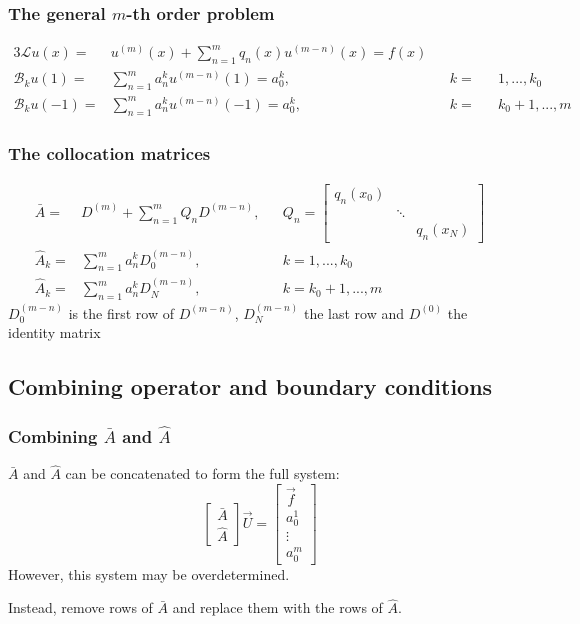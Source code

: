 \documentclass[handout]{beamer}
\begin{document}
\begin{frame}
\frametitle{The general $m$-th order problem}
\begin{alignat*}{3}
\mathcal{L} u(x) = &  u^{(m)}(x) + \sum_{n = 1}^m q_n(x) u^{(m-n)}(x) = f(x) \\
\mathcal{B}_k u(1) = & \sum_{n = 1}^m a_n^k u^{(m-n)}(1) = a_0^k, && k = && 1,...,k_0 \\
\mathcal{B}_k u(-1) = & \sum_{n = 1}^m a_n^k u^{(m-n)}(-1) = a_0^k, && k = && k_0+1,...,m 
\end{alignat*}
\end{frame}

\begin{frame}
\frametitle{The collocation matrices}
\begin{align*}
\bar{A} = & D^{(m)} + \sum_{n=1}^m Q_n D^{(m-n)}, && Q_n = \begin{bmatrix} q_n(x_0) & & \\ & \ddots & \\ & & q_n(x_N) \end{bmatrix} \\
\hat{A}_k = & \sum_{n=1}^m a_n^k D^{(m-n)}_0, && k = 1,...,k_0 \\
\hat{A}_k = & \sum_{n=1}^m a_n^k D^{(m-n)}_N, && k = k_0+1,...,m
\end{align*}
$D_0^{(m-n)}$ is the first row of $D^{(m-n)}$, $D_N^{(m-n)}$ the last row and $D^{(0)}$ the identity matrix
\end{frame}

\subsection{Combining operator and boundary conditions}

\begin{frame}
\frametitle{Combining $\bar{A}$ and $\hat{A}$}
$\bar{A}$ and $\hat{A}$ can be concatenated to form the full system:
\begin{equation*}
\begin{bmatrix} \bar{A} \\ \hat{A} \end{bmatrix} \vec{U} = \begin{bmatrix} \vec{f} \\ a_0^1 \\ \vdots \\ a_0^m \end{bmatrix}
\end{equation*}
However, this system may be overdetermined.

Instead, remove rows of $\bar{A}$ and replace them with the rows of $\hat{A}$.
\end{frame}
\end{document}

